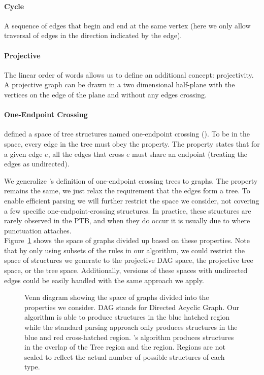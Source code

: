 \paragraph{Cycle}
A sequence of edges that begin and end at the same vertex (here we only allow traversal of edges in the direction indicated by the edge).

\paragraph{Projective}
The linear order of words allows us to define an additional concept: projectivity.
A projective graph can be drawn in a two dimensional half-plane with the vertices on the edge of the plane and without any edges crossing.

\paragraph{One-Endpoint Crossing}
\textcite{ec} defined a space of tree structures named one-endpoint crossing (\oneEC).
To be in the space, every edge in the tree must obey the \oneEC property.
The property states that for a given edge $e$, all the edges that cross $e$ must share an endpoint (treating the edges as undirected).

We generalize \textcite{ec}'s definition of one-endpoint crossing trees to graphs.
The \oneEC property remains the same, we just relax the requirement that the edges form a tree.
To enable efficient parsing we will further restrict the space we consider, not covering a few specific one-endpoint-crossing structures.
In practice, these structures are rarely observed in the PTB, and when they do occur it is usually due to where punctuation attaches. \\

Figure~\ref{fig:venn} shows the space of graphs divided up based on these properties.
Note that by only using subsets of the rules in our algorithm, we could restrict the space of structures we generate to the projective DAG space, the projective tree space, or the \oneEC tree space.
Additionally, versions of these spaces with undirected edges could be easily handled with the same approach we apply.

\begin{figure}
\centering
\scalebox{0.7}{

}
\caption[Venn diagram of graph space by properties]{\label{fig:venn} Venn diagram showing the space of graphs divided into the properties we consider.
DAG stands for Directed Acyclic Graph.
Our algorithm is able to produce structures in the blue hatched region while the standard parsing approach only produces structures in the blue and red cross-hatched region.
\textcite{ec}'s algorithm produces structures in the overlap of the Tree region and the \oneEC region.
Regions are not scaled to reflect the actual number of possible structures of each type.
}
\end{figure}

